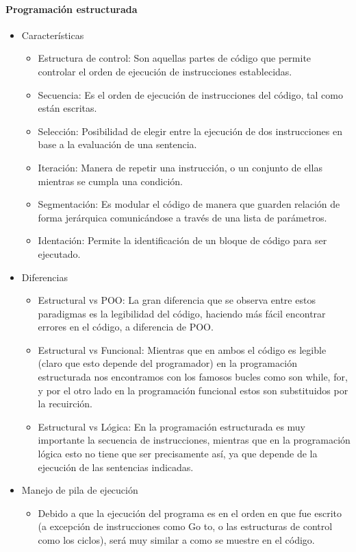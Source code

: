 \documentclass[10pt]{article}
\begin{document}
\paragraph{\normalsize Programación estructurada}
\begin{itemize}
  \item Características
    \begin{itemize}
      \item Estructura de control: Son aquellas partes de código que permite controlar el orden de ejecución de instrucciones establecidas.
      \item Secuencia: Es el orden de ejecución de instrucciones del código, tal como están escritas.
      \item Selección: Posibilidad de elegir entre la ejecución de dos instrucciones en base a la evaluación de una sentencia.
      \item Iteración: Manera de repetir una instrucción, o un conjunto de ellas mientras se cumpla una condición.
      \item Segmentación: Es modular el código de manera que guarden relación de forma jerárquica comunicándose a través de una lista de parámetros.
      \item Identación: Permite la identificación de un bloque de código para ser ejecutado.
    \end{itemize}
  \item Diferencias
    \begin{itemize}
      \item Estructural vs POO: La gran diferencia que se observa entre estos paradigmas es la legibilidad del código, haciendo más fácil encontrar errores en el código, a diferencia de POO.
      \item Estructural vs Funcional: Mientras que en  ambos el código es legible (claro que esto depende del programador) en la programación estructurada nos encontramos con los famosos bucles como son while, for, y por el otro lado en la programación funcional estos son substituidos por la recuirción.
      \item Estructural vs Lógica: En la programación estructurada es muy importante la secuencia de instrucciones, mientras que en la programación lógica esto no tiene que ser precisamente así, ya que depende de la ejecución de las sentencias indicadas.
    \end{itemize}
  \item Manejo de pila de ejecución
    \begin{itemize}
      \item Debido a que la ejecución del programa es en el orden en que fue escrito (a excepción de instrucciones como Go to, o las estructuras de control como los ciclos), será muy similar a como se muestre en el código.

\end{itemize}
\end{itemize}
\end{document}
